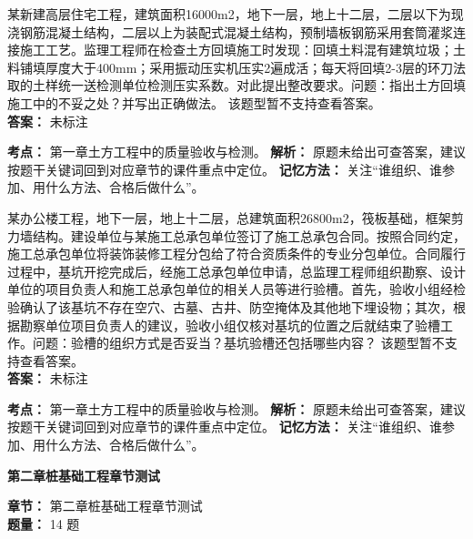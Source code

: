 \documentclass[UTF8,fontset=fandol,11pt]{ctexart}
\newcommand{\chaptertitle}[1]{\vspace{0.5em}\begin{tcolorbox}[enhanced,colback=deepblue,colframe=deepblue,arc=2mm,boxrule=0pt]\begin{center}\Large\bfseries\color{white}#1\end{center}\end{tcolorbox}\vspace{0.5em}}
\begin{document}
\vspace{0.2em}

\begin{quizbox}[title={第 34 题}]
某新建高层住宅工程，建筑面积16000m2，地下一层，地上十二层，二层以下为现浇钢筋混凝土结构，二层以上为装配式混凝土结构，预制墙板钢筋采用套筒灌浆连接施工工艺。监理工程师在检查土方回填施工时发现：回填土料混有建筑垃圾；土料铺填厚度大于400mm；采用振动压实机压实2遍成活；每天将回填2-3层的环刀法取的土样统一送检测单位检测压实系数。对此提出整改要求。问题：指出土方回填施工中的不妥之处？并写出正确做法。 该题型暂不支持查看答案。\\
\textbf{答案：} 未标注
\vspace{0.25em}
\begin{answerbox}[title={考点解析}]
\textbf{考点：} 第一章土方工程中的质量验收与检测。
\textbf{解析：} 原题未给出可查答案，建议按题干关键词回到对应章节的课件重点中定位。
\textbf{记忆方法：} 关注“谁组织、谁参加、用什么方法、合格后做什么”。
\end{answerbox}
\end{quizbox}

\vspace{0.2em}

\begin{quizbox}[title={第 35 题}]
某办公楼工程，地下一层，地上十二层，总建筑面积26800m2，筏板基础，框架剪力墙结构。建设单位与某施工总承包单位签订了施工总承包合同。按照合同约定，施工总承包单位将装饰装修工程分包给了符合资质条件的专业分包单位。合同履行过程中，基坑开挖完成后，经施工总承包单位申请，总监理工程师组织勘察、设计单位的项目负责人和施工总承包单位的相关人员等进行验槽。首先，验收小组经检验确认了该基坑不存在空穴、古墓、古井、防空掩体及其他地下埋设物；其次，根据勘察单位项目负责人的建议，验收小组仅核对基坑的位置之后就结束了验槽工作。问题：验槽的组织方式是否妥当？基坑验槽还包括哪些内容？ 该题型暂不支持查看答案。\\
\textbf{答案：} 未标注
\vspace{0.25em}
\begin{answerbox}[title={考点解析}]
\textbf{考点：} 第一章土方工程中的质量验收与检测。
\textbf{解析：} 原题未给出可查答案，建议按题干关键词回到对应章节的课件重点中定位。
\textbf{记忆方法：} 关注“谁组织、谁参加、用什么方法、合格后做什么”。
\end{answerbox}
\end{quizbox}

\vspace{0.2em}

\chaptertitle{第二章桩基础工程章节测试}
\begin{mainbox}
\textbf{\textcolor{mainblue}{章节：}} 第二章桩基础工程章节测试\\
\textbf{\textcolor{answerred}{题量：}} 14 题
\end{mainbox}
\end{document}
